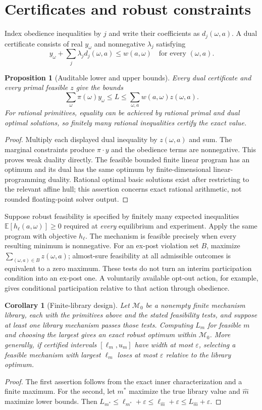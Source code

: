 \documentclass[11pt]{article}
\newtheorem{proposition}[theorem]{Proposition}
\newtheorem{corollary}[theorem]{Corollary}
\theoremstyle{definition}
\theoremstyle{remark}
\begin{document}
\section{Certificates and robust constraints}
Index obedience inequalities by $j$ and write their coefficients as $d_j(\omega,a)$. A dual certificate consists of real $y_\omega$ and nonnegative $\lambda_j$ satisfying
\[
 y_\omega+\sum_j\lambda_j d_j(\omega,a)\le w(a,\omega)
 \quad\text{for every }(\omega,a).
\]
\begin{proposition}[Auditable lower and upper bounds]
Every dual certificate and every primal feasible $z$ give the bounds
\[
 \sum_\omega\pi(\omega)y_\omega\le L\le\sum_{\omega,a}w(a,\omega)z(\omega,a).
\] For rational primitives, equality can be achieved by rational primal and dual optimal solutions, so finitely many rational inequalities certify the exact value.
\end{proposition}
\begin{proof}
Multiply each displayed dual inequality by $z(\omega,a)$ and sum. The marginal constraints produce $\pi\cdot y$ and the obedience terms are nonnegative. This proves weak duality directly. The feasible bounded finite linear program has an optimum and its dual has the same optimum by finite-dimensional linear-programming duality. Rational optimal basic solutions exist after restricting to the relevant affine hull; this assertion concerns exact rational arithmetic, not rounded floating-point solver output.
\end{proof}

Suppose robust feasibility is specified by finitely many expected inequalities $\mathbb E[h_\ell(a,\omega)]\ge0$ required at \emph{every} equilibrium and experiment. Apply the same program with objective $h_\ell$. The mechanism is feasible precisely when every resulting minimum is nonnegative. For an ex-post violation set $B$, maximize $\sum_{(\omega,a)\in B}z(\omega,a)$; almost-sure feasibility at all admissible outcomes is equivalent to a zero maximum. These tests do not turn an interim participation condition into an ex-post one. A voluntarily available opt-out action, for example, gives conditional participation relative to that action through obedience.

\begin{corollary}[Finite-library design]
Let $\mathcal M_0$ be a nonempty finite mechanism library, each with the primitives above and the stated feasibility tests, and suppose at least one library mechanism passes those tests. Computing $L_m$ for feasible $m$ and choosing the largest gives an exact robust optimum within $\mathcal M_0$. More generally, if certified intervals $[\ell_m,u_m]$ have width at most $\varepsilon$, selecting a feasible mechanism with largest $\ell_m$ loses at most $\varepsilon$ relative to the library optimum.
\end{corollary}
\begin{proof}
The first assertion follows from the exact inner characterization and a finite maximum. For the second, let $m^*$ maximize the true library value and $\hat m$ maximize lower bounds. Then $L_{m^*}\le\ell_{m^*}+\varepsilon\le\ell_{\hat m}+\varepsilon\le L_{\hat m}+\varepsilon$.
\end{proof}
\end{document}
